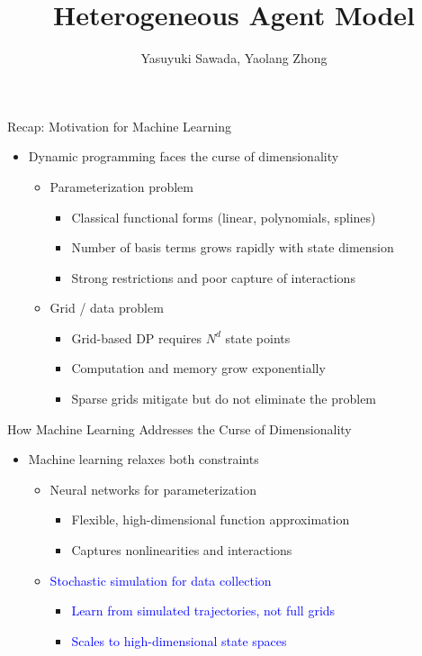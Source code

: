 \documentclass[aspectratio=169]{beamer}
\title{Heterogeneous Agent Model}
\author{Yasuyuki Sawada, Yaolang Zhong}
\institute{University of Tokyo\\
  \small \texttt{\href{mailto:yaolang.zhong@e.u-tokyo.ac.jp}{yaolang.zhong@e.u-tokyo.ac.jp}}}
\date{}
\newcommand{\1}{\mathbf{1}}
\begin{document}
\begin{frame}
\titlepage  
\end{frame}



\begin{frame}{Recap: Motivation for Machine Learning}
  \begin{itemize}
      \item Dynamic programming faces the curse of dimensionality
      \begin{itemize}
          \item Parameterization problem
          \begin{itemize}
              \item Classical functional forms (linear, polynomials, splines)
              \item Number of basis terms grows rapidly with state dimension
              \item Strong restrictions and poor capture of interactions
          \end{itemize}
          \item Grid / data problem
          \begin{itemize}
              \item Grid-based DP requires $N^d$ state points
              \item Computation and memory grow exponentially
              \item Sparse grids mitigate but do not eliminate the problem
          \end{itemize}
      \end{itemize}
  \end{itemize}
  \end{frame}

  \begin{frame}{How Machine Learning Addresses the Curse of Dimensionality}
    \begin{itemize}
        \item Machine learning relaxes both constraints
        \begin{itemize}
            \item Neural networks for parameterization
            \begin{itemize}
                \item Flexible, high-dimensional function approximation
                \item Captures nonlinearities and interactions
            \end{itemize}
            \item \textcolor{blue}{Stochastic simulation for data collection}
            \begin{itemize}
                \item \textcolor{blue}{Learn from simulated trajectories, not full grids}
                \item \textcolor{blue}{Scales to high-dimensional state spaces}
            \end{itemize}
        \end{itemize}
    \end{itemize}
    \end{frame}
\end{document}

